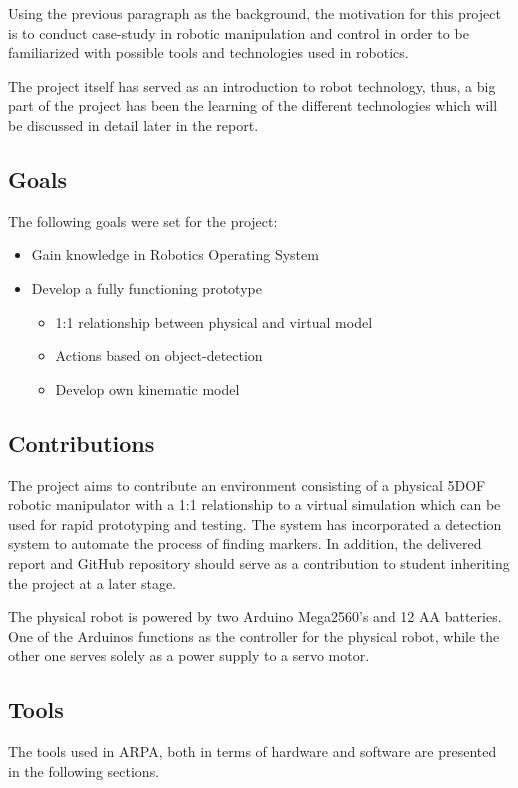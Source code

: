 \documentclass[11pt,a4paper, titlepage]{article}
\begin{document}
Using the previous paragraph as the background, the motivation for this project is to conduct case-study in robotic manipulation and control in order to be familiarized with possible tools and technologies used in robotics.

The project itself has served as an introduction to robot technology, thus, a big part of the project has been the learning of the different technologies which will be discussed in detail later in the report.

\subsection{Goals}
The following goals were set for the project:
\begin{itemize}
\item Gain knowledge in Robotics Operating System
\item Develop a fully functioning prototype
	\begin{itemize}
	\item 1:1 relationship between physical and virtual model
	\item Actions based on object-detection
	\item Develop own kinematic model	
	\end{itemize}
	
\end{itemize}


\newpage
\subsection{Contributions}
The project aims to contribute an environment consisting of a physical 5DOF robotic manipulator with a 1:1 relationship to a virtual simulation which can be used for rapid prototyping and testing. The system has incorporated a detection system to automate the process of finding markers. In addition, the delivered report and GitHub repository should serve as a contribution to student inheriting the project at a later stage.

The physical robot is powered by two Arduino Mega2560's and 12 AA batteries. One of the Arduinos functions as the controller for the physical robot, while the other one serves solely as a power supply to a servo motor.

\subsection{Tools}
The tools used in ARPA, both in terms of hardware and software are presented in the following sections.
\end{document}
